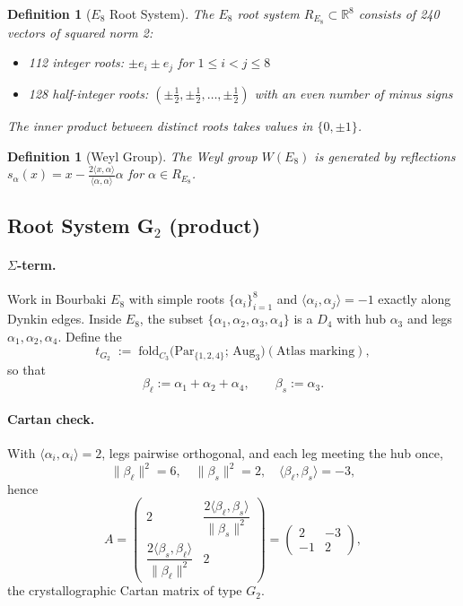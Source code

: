 \documentclass[12pt]{article}
\newtheorem{definition}[theorem]{Definition}
\newcommand{\RR}{\mathbb{R}}
\newcommand{\Weyl}{W}
\begin{document}
\begin{definition}[$E_8$ Root System]
The $E_8$ root system $R_{E_8} \subset \RR^8$ consists of 240 vectors of squared norm 2:
\begin{itemize}
\item 112 integer roots: $\pm e_i \pm e_j$ for $1 \leq i < j \leq 8$
\item 128 half-integer roots: $(\pm \tfrac12, \pm \tfrac12, \ldots, \pm \tfrac12)$ with an even number of minus signs
\end{itemize}
The inner product between distinct roots takes values in $\{0, \pm1\}$.
\end{definition}

\begin{definition}[Weyl Group]
The Weyl group $\Weyl(E_8)$ is generated by reflections $s_\alpha(x) = x - \frac{2\langle x, \alpha\rangle}{\langle \alpha, \alpha\rangle} \alpha$ for $\alpha \in R_{E_8}$.
\end{definition}

\subsection{Root System G$_2$ (product)}\label{sec:g2-fold}

\paragraph{$\Sigma$-term.}
Work in Bourbaki $E_8$ with simple roots $\{\alpha_i\}_{i=1}^8$ and $\langle\alpha_i,\alpha_j\rangle=-1$ exactly along Dynkin edges. Inside $E_8$, the subset $\{\alpha_1,\alpha_2,\alpha_3,\alpha_4\}$ is a $D_4$ with hub $\alpha_3$ and legs $\alpha_1,\alpha_2,\alpha_4$.
Define the 
\[
t_{G_2}\;:=\;\mathrm{fold}_{C_3}\!\big(\mathrm{Par}_{\{1,2,4\}};\,\mathrm{Aug}_{3}\big)(\text{Atlas marking}),
\]
so that
\[
\beta_\ell:=\alpha_1+\alpha_2+\alpha_4,\qquad \beta_s:=\alpha_3.
\]

\paragraph{Cartan check.}
With $\langle\alpha_i,\alpha_i\rangle=2$, legs pairwise orthogonal, and each leg meeting the hub once,
\[
\|\beta_\ell\|^2=6,\quad \|\beta_s\|^2=2,\quad \langle \beta_\ell,\beta_s\rangle=-3,
\]
hence
\[
A=\begin{pmatrix}
2 & \dfrac{2\langle\beta_\ell,\beta_s\rangle}{\|\beta_s\|^2}\\[4pt]
\dfrac{2\langle\beta_s,\beta_\ell\rangle}{\|\beta_\ell\|^2} & 2
\end{pmatrix}
=
\begin{pmatrix}2&-3\\-1&2\end{pmatrix},
\]
the crystallographic Cartan matrix of type $G_2$.
\end{document}
